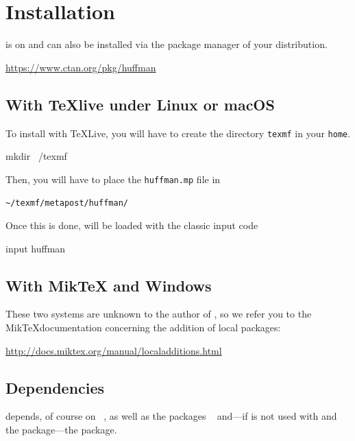 \documentclass[english]{ltxdoc}
\begin{document}
\section{Installation}

\huffman is on \ctan{} and can also be installed via the package manager of your
distribution.

\begin{center}
  \url{https://www.ctan.org/pkg/huffman}
\end{center}


\subsection{With \TeX live under Linux or macOS}

To install \huffman with \TeX Live, you will have to create the directory
\lstinline+texmf+  in your \lstinline+home+. 

\begin{commandshell}
mkdir ~/texmf
\end{commandshell}

Then, you will have to place the \lstinline+huffman.mp+ file in 
\begin{center}
  \lstinline+~/texmf/metapost/huffman/+
\end{center}


Once this is done, \huffman will be loaded with the classic \MP{}
input code
\begin{mpcode}
input huffman
\end{mpcode}

\subsection{With Mik\TeX{} and Windows}

These two systems are unknown to the author of \huffman, so we
refer you to the Mik\TeX documentation concerning the addition of local packages:
\begin{center}
  \url{http://docs.miktex.org/manual/localadditions.html}
\end{center}



\subsection{Dependencies}


\huffman depends, of course on \MP~\cite{ctan-metapost}, as well as the packages
~\cite{ctan-metaobj} and---if \huffman is not used with
 and the  package---the 
package. 
\end{document}
